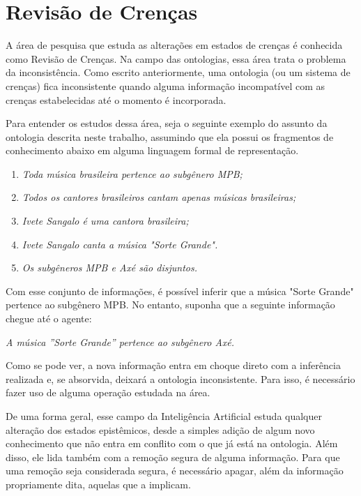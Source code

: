 \chapter{Revisão de Crenças}
\label{chap:revisao}

\lettrine{A}{} área de pesquisa que estuda as alterações em estados de crenças é conhecida como Revisão de Crenças. Na campo das ontologias, essa área trata o problema da inconsistência. Como escrito anteriormente, uma ontologia (ou um sistema de crenças) fica inconsistente quando alguma informação incompatível com as crenças estabelecidas até o momento é incorporada.

Para entender os estudos dessa área, seja o seguinte exemplo do assunto da ontologia descrita neste trabalho, assumindo que ela possui os fragmentos de conhecimento abaixo em alguma linguagem formal de representação.

\begin{enumerate}
	\item \textit{Toda música brasileira pertence ao subgênero MPB;}
	\item \textit{Todos os cantores brasileiros cantam apenas músicas brasileiras;}
	\item \textit{Ivete Sangalo é uma cantora brasileira;}
	\item \textit{Ivete Sangalo canta a música "Sorte Grande".}
	\item \textit{Os subgêneros MPB e Axé são disjuntos.}
\end{enumerate}

Com esse conjunto de informações, é possível inferir que a música "Sorte Grande" pertence ao subgênero MPB. No entanto, suponha que a seguinte informação chegue até o agente:

\begin{center}
	\textit{A música ''Sorte Grande'' pertence ao subgênero Axé.}
\end{center}

Como se pode ver, a nova informação entra em choque direto com a inferência realizada e, se absorvida, deixará a ontologia inconsistente. Para isso, é necessário fazer uso de alguma operação estudada na área.

De uma forma geral, esse campo da Inteligência Artificial estuda qualquer alteração dos estados epistêmicos, desde a simples adição de algum novo conhecimento que não entra em conflito com o que já está na ontologia. Além disso, ele lida também com a remoção segura de alguma informação. Para que uma remoção seja considerada segura, é necessário apagar, além da informação propriamente dita, aquelas que a implicam. 

